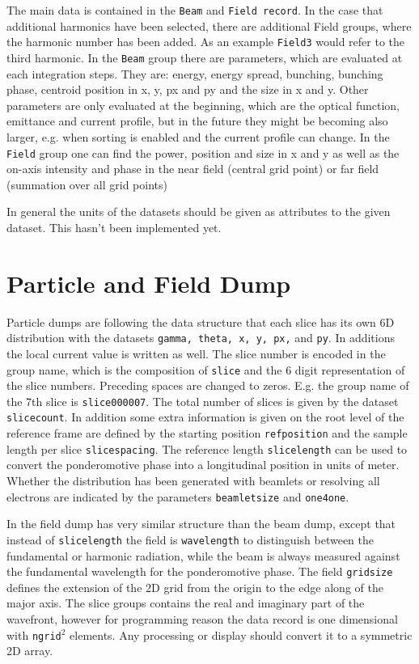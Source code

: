 \documentclass[12pt]{book}
\begin{document}
The main data is contained in the {\tt Beam} and {\tt Field record}. In the case that additional harmonics have been selected, there are additional Field groups, where the harmonic number has been added. As an example {\tt Field3} would refer to the third harmonic. In the {\tt Beam} group there are parameters, which are evaluated at each integration steps. They are: energy, energy spread, bunching, bunching phase, centroid position in x, y, px and py and the size in x and y.  Other parameters are only evaluated at the beginning, which are the optical function, emittance and current profile, but in the future they might be becoming also larger, e.g. when sorting is enabled and the current profile can change. In the {\tt Field} group one can find the power, position and size in x and y as well as the on-axis intensity and phase in the near field (central grid point) or far field (summation over all grid points)

In general the units of the datasets should be given as attributes to the given dataset.
This hasn't been implemented yet.


\section{\sf Particle and Field Dump}

Particle dumps are following the data structure that each slice has its own 6D distribution with the datasets {\tt gamma, theta, x, y, px,} and {\tt py}. In additions the local current value is written as well. The slice number is encoded in the group name, which is the composition of {\tt slice} and the 6 digit representation of the slice numbers. Preceding spaces are changed to zeros. E.g. the group name of the 7th slice is {\tt slice000007}. The total number of slices is given by the dataset {\tt slicecount}. In addition some extra information is given on the root level of the reference frame are defined by the starting position {\tt refposition} and the sample length per slice {\tt slicespacing}. The reference length {\tt slicelength} can be used to convert the ponderomotive phase into a longitudinal position in units of meter. Whether the distribution has been generated with beamlets or resolving all electrons are indicated by the parameters {\tt beamletsize} and {\tt one4one}.

In the field dump has very similar structure than the beam dump, except that instead of {\tt slicelength} the field is {\tt wavelength} to distinguish between the fundamental or harmonic radiation, while the beam is always measured against the fundamental wavelength for the ponderomotive phase. The field {\tt gridsize} defines the extension of the 2D grid from the origin to the edge along of the major axis. The slice groups contains the real and imaginary part of the wavefront, however for programming reason the data record is one dimensional with {\tt ngrid}$^2$ elements. Any processing or display should convert it to a symmetric 2D array.
\end{document}
